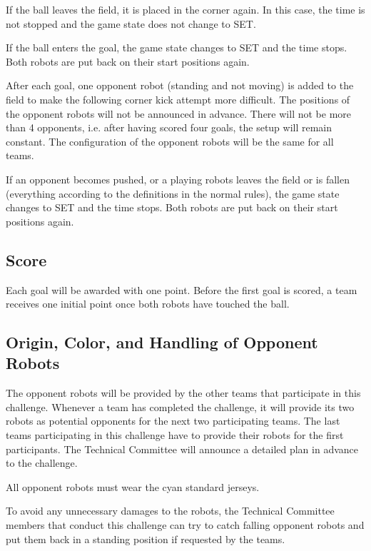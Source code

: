 \documentclass[12pt]{article}
\begin{document}
If the ball leaves the field, it is placed in the corner again. In this case, the time is not stopped and the game state does not change to SET. 

If the ball enters the goal, the game state changes to SET and the time stops. Both robots are put back on their start positions again.

After each goal, one opponent robot (standing and not moving) is added to the field to make the following corner kick attempt more difficult. The positions of the opponent robots will not be announced in advance. There will not be more than 4 opponents, i.e. after having scored four goals, the setup will remain constant. The configuration of the opponent robots will be the same for all teams. 

If an opponent becomes pushed, or a playing robots leaves the field or is fallen (everything according to the definitions in the normal rules), the game state changes to SET and the time stops. Both robots are put back on their start positions again.

\subsection{Score}
Each goal will be awarded with one point.
Before the first goal is scored, a team receives one initial point once both robots have touched the ball.

\subsection{Origin, Color, and Handling of Opponent Robots}
The opponent robots will be provided by the other teams that participate in this challenge. Whenever a team has completed the challenge, it will provide its two robots as potential opponents for the next two participating teams. The last teams participating in this challenge have to provide their robots for the first participants. The Technical Committee will announce a detailed plan in advance to the challenge.

All opponent robots must wear the cyan standard jerseys.

To avoid any unnecessary damages to the robots, the Technical Committee members that conduct this challenge can try to catch falling opponent robots and put them back in a standing position if requested by the teams.

\newpage
\end{document}
